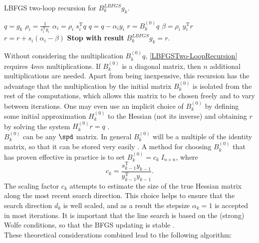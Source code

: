 \begin{algorithm}[H]
	\caption{LBFGS two-loop recursion for $B^{LBFGS}_k g_k$.} \label{LBFGSTwo-LoopRecursion}
	\begin{algorithmic}[1]
        \State $q = g_k$
            \State $\rho_i = \frac{1}{s^{\mathrm{T}}_{i} y_i}$
            \State $\alpha_i = \rho_i \; s^{\mathrm{T}}_i q$ 
            \State $q = q - \alpha_i y_i$
        \EndFor
        \State $r = B^{(0)}_k q$
            \State $\beta = \rho_i \; y^{\mathrm{T}}_i r$ 
            \State $r= r + s_i (\alpha_i - \beta)$
        \EndFor
		\State \textbf{Stop with result} $B^{LBFGS}_k g_k = r$.
    \end{algorithmic}
\end{algorithm}

Without considering the multiplication $B^{(0)}_k q$, \cref{LBFGSTwo-LoopRecursion} requires $4mn$ multiplications. If $B^{(0)}_k$ is a diagonal matrix, then $n$ additional multiplications are needed. Apart from being inexpensive, this recursion has the advantage that the multiplication by the initial matrix $B^{(0)}_k$ is isolated from the rest of the computations, which allows this matrix to be chosen freely and to vary between iterations. One may even use an implicit choice of $B^{(0)}_k$ by defining some initial approximation $H^{(0)}_k$ to the Hessian (not its inverse) and obtaining $r$ by solving the system $H^{(0)}_k r = q$ \cite[p.~178]{NocedalWright:2006}. \\
$B^{(0)}_k$ can be any $\spd$ matrix. In general $B^{(0)}_k$ will be a multiple of the identity matrix, so that it can be stored very easily \cite[p.~198]{GeigerKanzow:1999}. A method for choosing $B^{(0)}_k$ that has proven effective in practice is to set $B^{(0)}_k = c_k \; I_{n \times n}$, where
\begin{equation}\label{initialMatrixNorm}
    c_k = \frac{s^{\mathrm{T}}_{k-1} y_{k-1}}{y^{\mathrm{T}}_{k-1} y_{k-1}}.
\end{equation}
The scaling factor $c_k$ attempts to estimate the size of the true Hessian matrix along the most recent search direction. This choice helps to ensure that the search direction $d_k$ is well scaled, and as a result the stepsize $\alpha_k = 1$ is accepted in most iterations. It is important that the line search is based on the (strong) Wolfe conditions, so that the BFGS updating is stable \cite[p.~178-179]{NocedalWright:2006}. \\
These theoretical considerations combined lead to the following algorithm:

